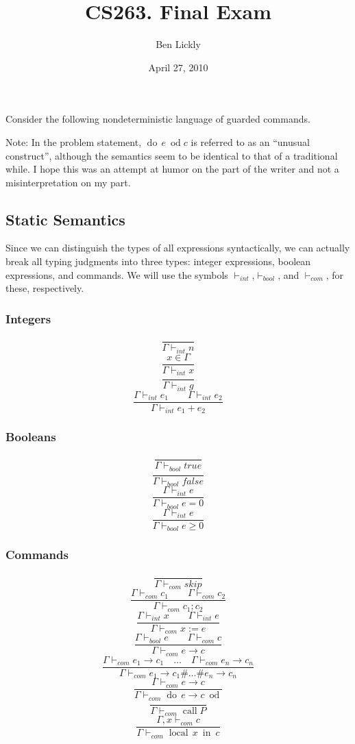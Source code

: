 \documentclass{article}
\title{CS263. Final Exam}
\author{Ben Lickly}
\date{April 27, 2010}
\newcommand{\problem}[1]
{\subsubsection*{} %
\vspace{-16pt} \section{} \vspace{-22pt} \qquad
#1%
\bigskip \bigskip
}
\newcommand{\proves}{\vdash}
\newcommand{\dood}[1]{\operatorname{do}\, #1\ \operatorname{od}}
\newcommand{\callP}{\operatorname{call} P}
\newcommand{\localin}[2]{\operatorname{local}\, #1\ \operatorname{in}\ #2}
\begin{document}
\maketitle

\problem{Consider the following nondeterministic language of guarded commands.
}

Note: In the problem statement, $\dood{e}{c}$ is referred to as an ``unusual
construct'', although the semantics seem to be identical to that of a
traditional while.  I hope this was an attempt at humor on the part of the
writer and not a misinterpretation on my part.

\subsection{Static Semantics}

    Since we can distinguish the types of all expressions syntactically, we can
    actually break all typing judgments into three types: integer expressions,
    boolean expressions, and commands.  We will use the symbols
    $\proves_{int}$,$\proves_{bool}$, and $\proves_{com}$, for these,
    respectively.
\subsubsection*{Integers}
\[\frac{}
{\Gamma \proves_{int} n}
\]
\[\frac{x \in \Gamma}
{\Gamma \proves_{int} x}
\]
\[\frac{}
{\Gamma \proves_{int} g}
\]
\[\frac{\Gamma \proves_{int} e_1 \qquad \Gamma \proves_{int} e_2}
{\Gamma \proves_{int} e_1 + e_2}
\]

\subsubsection*{Booleans}
\[\frac{}
{\Gamma \proves_{bool} true}
\]
\[\frac{}
{\Gamma \proves_{bool} false}
\]
\[\frac{\Gamma \proves_{int} e}
{\Gamma \proves_{bool} e = 0}
\]
\[\frac{\Gamma \proves_{int} e}
{\Gamma \proves_{bool} e \ge 0}
\]

\subsubsection*{Commands}
\[\frac{}
{\Gamma \proves_{com} skip}
\]
\[\frac{\Gamma \proves_{com} c_1 \qquad \Gamma \proves_{com} c_2}
{\Gamma \proves_{com} c_1; c_2}
\]
\[\frac{\Gamma \proves_{int} x \qquad \Gamma \proves_{int} e}
{\Gamma \proves_{com} x := e}
\]
\[\frac{\Gamma \proves_{bool} e \qquad \Gamma \proves_{com} c}
{\Gamma \proves_{com} e \rightarrow c}
\]
\[\frac{\Gamma \proves_{com} e_1 \rightarrow c_1 \quad \dots \quad
        \Gamma \proves_{com} e_n \rightarrow c_n}
{\Gamma \proves_{com} e_1 \rightarrow c_1 \# \dots \# e_n \rightarrow c_n}
\]
\[\frac{\Gamma \proves_{com} e \rightarrow c}
{\Gamma \proves_{com} \dood{e \rightarrow c}}
\]
\[\frac{}
{\Gamma \proves_{com} \callP }
\]
\[\frac{\Gamma,x \proves_{com} c}
{\Gamma \proves_{com} \localin{x}{c}}
\]
\end{document}
